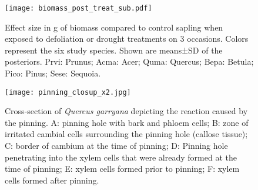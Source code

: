 \documentclass{article}
\begin{document}
	\begin{figure}[H]
		\centering
		\begin{minipage}[t]{0.5\textwidth} %
			\vspace{0pt} %
			\texttt{[image: biomass\_post\_treat\_sub.pdf]}
		\end{minipage}%
		\hfill
		\begin{minipage}[t]{0.5\textwidth} %
			\vspace{0pt} %
			\caption{Effect size in g of biomass compared to control sapling when exposed to defoliation or drought treatments on 3 occasions. Colors represent the six study species. Shown are means±SD of the posteriors. Prvi: Prunus; Acma: Acer; Quma: Quercus; Bepa: Betula; Pico: Pinus; Sese: Sequoia.}
			\label{fig:biomass_post_treat_sub}
		\end{minipage}
	\end{figure}
	
	
	
	\begin{figure}[H]
		\centering
		\begin{minipage}[t]{0.6\textwidth} %
			\vspace{0pt} %
			\texttt{[image: pinning\_closup\_x2.jpg]}
		\end{minipage}%
		\hfill
		\begin{minipage}[t]{0.4\textwidth} %
			\vspace{0pt} %
			\caption{Cross-section of \textit{Quercus garryana} depicting the reaction caused by the pinning. A: pinning hole with bark and phloem cells; B: zone of irritated cambial cells surrounding the pinning hole (callose tissue); C: border of cambium at the time of pinning; D: Pinning hole penetrating into the xylem cells that were already formed at the time of pinning; E: xylem cells formed prior to pinning; F: xylem cells formed after pinning.}
			\label{fig:pinning_closup_x2}
		\end{minipage}
	\end{figure}
	
\end{document}
